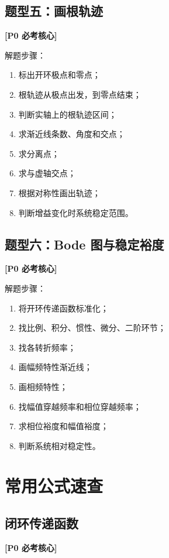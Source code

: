 \documentclass[UTF8,a4paper,12pt]{ctexart}
\newcommand{\Pzero}{\textcolor{p0}{\textbf{[P0 必考核心]}}}
\begin{document}
\subsection{题型五：画根轨迹}

\Pzero

解题步骤：

\begin{enumerate}
    \item 标出开环极点和零点；
    \item 根轨迹从极点出发，到零点结束；
    \item 判断实轴上的根轨迹区间；
    \item 求渐近线条数、角度和交点；
    \item 求分离点；
    \item 求与虚轴交点；
    \item 根据对称性画出轨迹；
    \item 判断增益变化时系统稳定范围。
\end{enumerate}

\subsection{题型六：Bode 图与稳定裕度}

\Pzero

解题步骤：

\begin{enumerate}
    \item 将开环传递函数标准化；
    \item 找比例、积分、惯性、微分、二阶环节；
    \item 找各转折频率；
    \item 画幅频特性渐近线；
    \item 画相频特性；
    \item 找幅值穿越频率和相位穿越频率；
    \item 求相位裕度和幅值裕度；
    \item 判断系统相对稳定性。
\end{enumerate}

\section{常用公式速查}

\subsection{闭环传递函数}

\Pzero
\end{document}

